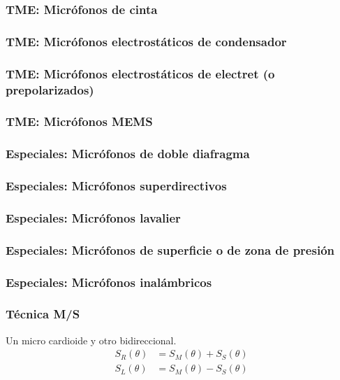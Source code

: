 \documentclass[a4paper, 8pt]{extarticle}
\begin{document}
\begin{multicols}{3}
  \subsubsection{TME: Micrófonos de cinta}
  \subsubsection{TME: Micrófonos electrostáticos de condensador}
  \subsubsection{TME: Micrófonos electrostáticos de electret (o prepolarizados)}
  \subsubsection{TME: Micrófonos MEMS}
  \subsubsection{Especiales: Micrófonos de doble diafragma}
  \subsubsection{Especiales: Micrófonos superdirectivos}
  \subsubsection{Especiales: Micrófonos lavalier}
  \subsubsection{Especiales: Micrófonos de superficie o de zona de presión}
  \subsubsection{Especiales: Micrófonos inalámbricos}
  \subsubsection{Técnica M/S}
  Un micro cardioide y otro bidireccional.
  \begin{align*}
    S_R (\theta ) & = S_M (\theta ) + S_S (\theta ) \\
    S_L (\theta ) & = S_M (\theta ) - S_S (\theta )
  \end{align*}


\end{multicols}
\end{document}
